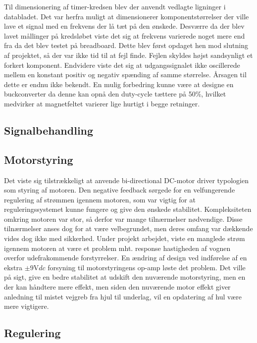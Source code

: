 Til dimensionering af timer-kredsen blev der anvendt vedlagte ligninger i databladet.
Det var herfra muligt at dimensionerer komponentstørrelser der ville lave et signal med en frekvens der lå tæt på den ønskede.
Desværre da der blev lavet mållinger på kredsløbet viste det sig at frekvens varierede noget mere end fra da det blev testet på breadboard.
Dette blev først opdaget hen mod slutning af projektet, så der var ikke tid til at fejl finde.
Fejlen skyldes højst sandsynligt et forkert komponent.
Endvidere viste det sig at udgangssignalet ikke oscillerede mellem en konstant positiv og negativ spænding af samme størrelse.
Årsagen til dette er endnu ikke bekendt.
En mulig forbedring kunne være at designe en buckconverter da denne kan opnå den duty-cycle tættere på 50\%, hvilket medvirker at magnetfeltet varierer lige hurtigt i begge retninger.

\subsection{Signalbehandling}



\subsection{Motorstyring}
Det viste sig tilstrækkeligt at anvende bi-directional DC-motor driver typologien som styring af motoren. 
Den negative feedback sørgede for en velfungerende regulering af strømmen igennem motoren, som var vigtig for at reguleringssystemet kunne fungere og give den ønskede stabilitet.
Kompleksiteten omkring motoren var stor, så derfor var mange tilnærmelser nødvendige.
Disse tilnærmelser anses dog for at være velbegrundet, men deres omfang var dækkende vides dog ikke med sikkerhed.
Under projekt arbejdet, viste en manglede strøm igennem motoren at være et problem mht. response hastigheden af vognen overfor udefrakommende forstyrrelser.     
En ændring af design ved indførelse af en ekstra $\pm 9 \si{\volt}dc$ forsyning til motorstyringens op-amp løste det problem.
Det ville på sigt, give en bedre stabilitet at udskift den nuværende motorstyring, men en der kan håndtere mere effekt, men siden den nuværende motor effekt giver anledning til mistet vejgreb fra hjul til underlag, vil en opdatering af hul være mere vigtigere. 


\subsection{Regulering}





